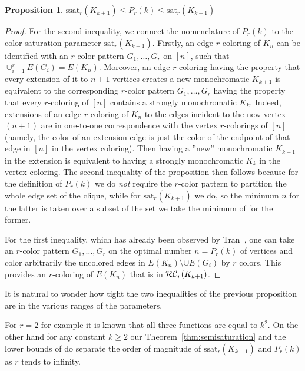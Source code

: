 \documentclass[12pt]{article}
\newtheorem{proposition}{Proposition}
\theoremstyle{definition}
\begin{document}
	\begin{proposition} \label{prop:ssat-P-sat}
		$\mathrm{ssat}_r(K_{k+1}) \leq P_r(k) \leq \mathrm{sat}_r(K_{k+1})$
	\end{proposition}
	\begin{proof}
		 For the second inequality, we connect the nomenclature of $P_r(k)$ to the color saturation parameter $\mathrm{sat}_r(K_{k+1})$. Firstly, an edge $r$-coloring of $K_n$ can be identified with an $r$-color pattern $G_1, \ldots , G_r$ on $[n]$, such that $\cup_{i=1}^r E(G_i) = E(K_n)$. Moreover, an edge $r$-coloring having the property that every extension of it to $n+1$ vertices creates a new monochromatic $K_{k+1}$ is equivalent to the corresponding $r$-color pattern $G_1, \ldots , G_r$ having the property that every $r$-coloring of $[n]$ contains a strongly monochromatic $K_k$. Indeed, extensions of an edge $r$-coloring of $K_n$ to the edges incident to the new vertex $(n+1)$ are in one-to-one correspondence with the vertex $r$-colorings of $[n]$ (namely, the color of an extension edge is just the color of the endpoint of that edge in $[n]$ in the vertex coloring). Then having a ''new'' monochromatic $K_{k+1}$ in the extension is equivalent to having a strongly monochromatic $K_k$ in the vertex coloring. 
		The second inequality of the proposition then follows because for the definition of $P_r(k)$ we do {\em not} require the $r$-color pattern to partition the whole edge set of the clique, while for $\mathrm{sat}_r(K_{k+1})$ we do, so the minimum $n$ for the latter is taken over a subset of the set we take the minimum of for the former. 
        
        For the first inequality, which has already been observed by Tran~\cite{tran2022two}, one can take an $r$-color pattern $G_1, \ldots , G_r$ on the optimal number $n=P_r(k)$ of vertices and color arbitrarily the uncolored edges in $E(K_n) \setminus \cup E(G_i)$ by $r$ colors. This provides an $r$-coloring of $E(K_n)$ that is in ${\cal RC}_r(K_{k+1})$. 
     \end{proof}

It is natural to wonder how tight the two inequalities of the previous proposition are in the various ranges of the parameters. 

For $r=2$ for example it is known \cite{damasdi2021saturation} that all three functions are equal to $k^2$. 
On the other hand for any constant $k\geq 2$ our Theorem~\ref{thm:semisaturation} and the lower bounds of \cite{fox2016minimum} do separate the order of magnitude of $\mathrm{ssat}_r(K_{k+1})$ and $P_r(k)$ as $r$ tends to infinity. 
\end{document}
